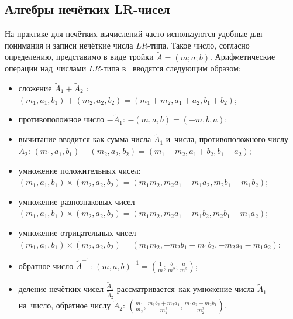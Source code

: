 \subsection{Алгебры нечётких LR-чисел}
На практике для нечётких вычислений часто используются удобные для понимания и записи нечёткие числа $LR$-типа. Такое число, согласно определению, представимо в виде тройки $\tilde{A}=\left( m;a;b \right)$. Арифметические операции над~числами $LR$-типа в~\cite{Pospelov, Yakhyaeva, Borisov} вводятся следующим образом:
\begin{itemize}
	\item сложение ${{\tilde{A}}_{1}}+{{\tilde{A}}_{2}}$ : $\left( {{m}_{1}},{{a}_{1}},{{b}_{1}} \right)+\left( {{m}_{2}},{{a}_{2}},{{b}_{2}} \right)=\left( {{m}_{1}}+{{m}_{2}},{{a}_{1}}+{{a}_{2}},{{b}_{1}}+{{b}_{2}} \right)$;
	\item противоположное число $-{{\tilde{A}}_{1}}$: $-\left( m,a,b \right)=\left( -m,b,a \right)$;
	\item вычитание вводится как сумма числа ${{\tilde{A}}_{1}}$ и~числа, противоположного числу ${{\tilde{A}}_{2}}$: $\left( {{m}_{1}},{{a}_{1}},{{b}_{1}} \right)-\left( {{m}_{2}},{{a}_{2}},{{b}_{2}} \right)=\left( {{m}_{1}}-{{m}_{2}},{{a}_{1}}+{{b}_{2}},{{b}_{1}}+{{a}_{2}} \right)$;
	\item умножение положительных чисел: $\left( {{m}_{1}},{{a}_{1}},{{b}_{1}} \right)\times \left( {{m}_{2}},{{a}_{2}},{{b}_{2}} \right)=\left( {{m}_{1}}{{m}_{2}},{{m}_{2}}{{a}_{1}}+{{m}_{1}}{{a}_{2}},{{m}_{2}}{{b}_{1}}+{{m}_{1}}{{b}_{2}} \right)$;
	\item умножение разнознаковых чисел $\left( {{m}_{1}},{{a}_{1}},{{b}_{1}} \right)\times \left( {{m}_{2}},{{a}_{2}},{{b}_{2}} \right)=\left( {{m}_{1}}{{m}_{2}},{{m}_{2}}{{a}_{1}}-{{m}_{1}}{{b}_{2}},{{m}_{2}}{{b}_{1}}-{{m}_{1}}{{a}_{2}} \right)$;
	\item умножение отрицательных чисел $\left( {{m}_{1}},{{a}_{1}},{{b}_{1}} \right)\times \left( {{m}_{2}},{{a}_{2}},{{b}_{2}} \right)=\left( {{m}_{1}}{{m}_{2}},-{{m}_{2}}{{b}_{1}}-{{m}_{1}}{{b}_{2}},-{{m}_{2}}{{a}_{1}}-{{m}_{1}}{{a}_{2}} \right)$;
	\item обратное число $\displaystyle {\tilde A}^{-1}$: ${{\left( m,a,b \right)}^{-1}}=\left( \frac{1}{m};\frac{b}{{{m}^{2}}};\frac{a}{{{m}^{2}}} \right)$;
	\item деление нечётких чисел $\displaystyle \frac{{{{\tilde{A}}}_{1}}}{{{{\tilde{A}}}_{2}}}$ рассматривается~как умножение числа ${{\tilde{A}}_{1}}$ на~число, обратное числу ${{\tilde{A}}_{2}}$: $\displaystyle \left( \frac{{{m}_{1}}}{{{m}_{2}}},\frac{{{m}_{1}}{{b}_{2}}+{{m}_{2}}{{a}_{1}}}{m_{2}^{2}},\frac{{{m}_{1}}{{a}_{2}}+{{m}_{2}}{{b}_{1}}}{m_{2}^{2}} \right)$.
\end{itemize}

